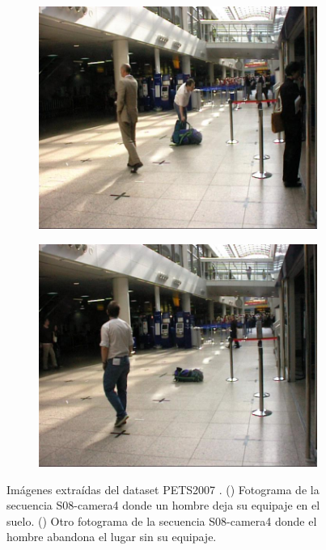 \begin{figure}[ht]
  \centering
  \begin{subfigure}[b]{0.4\textwidth}
    \includegraphics[width=\textwidth]{img/chapters/resultados/datasets/pets2007_1.jpg}
    \caption{}
    \label{fig:pets2007_1}
  \end{subfigure}
  \qquad\qquad
  \begin{subfigure}[b]{0.4\textwidth}
    \includegraphics[width=\textwidth]{img/chapters/resultados/datasets/pets2007_2.jpg}
    \caption{}
    \label{fig:pets2007_2}
  \end{subfigure}
  \caption{Imágenes extraídas del dataset PETS2007 \cite{pets2007-dataset}.
    (\protect{}) Fotograma de la secuencia S08-camera4 donde un hombre deja su equipaje en el suelo.
    (\protect{}) Otro fotograma de la secuencia S08-camera4 donde el hombre abandona el lugar sin su equipaje.}
  \label{fig:pets2007_S08}
\end{figure}

